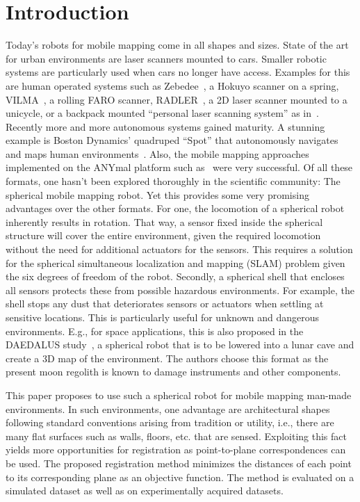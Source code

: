 \section{Introduction}

Today's robots for mobile mapping come in all shapes and sizes.
State of the art for urban environments are laser scanners mounted to cars.
Smaller robotic systems are particularly used when cars no longer have access.
Examples for this are human operated systems such as Zebedee~\cite{Bosse2012-zebedee}, a Hokuyo scanner on a spring, VILMA~\cite{JPRS2016}, a rolling FARO scanner, RADLER~\cite{Borrmann2020-RADLER}, a 2D laser scanner mounted to a unicycle, or a backpack mounted ``personal laser scanning system'' as in~\cite{LauterbackEtAl2015-Backpack}.
Recently more and more autonomous systems gained maturity.
A stunning example is Boston Dynamics' quadruped ``Spot'' that autonomously navigates and maps human environments~\cite{SpotRobot}.
Also, the mobile mapping approaches implemented on the ANYmal platform such as~\cite{Fankhauser2018-ANYmal} were very successful.
Of all these formats, one hasn't been explored thoroughly in the scientific community: The spherical mobile mapping robot.
Yet this provides some very promising advantages over the other formats.
For one, the locomotion of a spherical robot inherently results in rotation.
That way, a sensor fixed inside the spherical structure will cover the entire environment, given the required locomotion without the need for additional actuators for the sensors.
This requires a solution for the spherical simultaneous localization and mapping (SLAM) problem given the six degrees of freedom of the robot.
Secondly, a spherical shell that encloses all sensors protects these from possible hazardous environments.
For example, the shell stops any dust that deteriorates sensors or actuators when settling at sensitive locations.
This is particularly useful for unknown and dangerous environments.
E.g., for space applications, this is also proposed in the DAEDALUS study~\cite{RossiMaurelliUnnithanetal.2021}, a spherical robot that is to be lowered into a lunar cave and create a 3D map of the environment. The authors choose this format as the present moon regolith is known to damage instruments and other components.

This paper proposes to use such a spherical robot for mobile mapping man-made environments.
In such environments, one advantage are architectural shapes following standard conventions arising from tradition or utility, i.e., there are many flat surfaces such as walls, floors, etc. that are sensed.
Exploiting this fact yields more opportunities for registration as point-to-plane correspondences can be used.
The proposed registration method minimizes the distances of each point to its corresponding plane as an objective function.
The method is evaluated on a simulated dataset as well as on experimentally acquired datasets.
